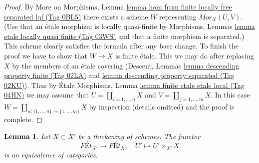 \documentclass{amsart}
\theoremstyle{plain}
\newtheorem{lemma}[subsection]{Lemma}
\theoremstyle{definition}
\theoremstyle{remark}
\numberwithin{equation}{subsection}
\begin{document}
\begin{proof}
By More on Morphisms, Lemma
\href{https://stacks.math.columbia.edu/tag/0BL5}{lemma hom from finite locally free separated lqf (Tag 0BL5)}
there exists a scheme $W$ representing $\mathit{Mor}_X(U, V)$.
(Use that an \'etale morphism is locally quasi-finite by
Morphisms, Lemmas \href{https://stacks.math.columbia.edu/tag/03WS}{lemma etale locally quasi finite (Tag 03WS)}
and that a finite morphism is separated.)
This scheme clearly satisfies the formula after any base change.
To finish the proof we have to show that $W \to X$ is finite \'etale.
This we may do after replacing $X$ by the members of an \'etale
covering (Descent, Lemmas \href{https://stacks.math.columbia.edu/tag/02LA}{lemma descending property finite (Tag 02LA)}
and \href{https://stacks.math.columbia.edu/tag/02KU}{lemma descending property separated (Tag 02KU)}).
Thus by \'Etale Morphisms, Lemma \href{https://stacks.math.columbia.edu/tag/04HN}{lemma finite etale etale local (Tag 04HN)}
we may assume that $U = \coprod_{i = 1, \ldots, n} X$
and $V = \coprod_{j = 1, \ldots, m} X$.
In this case
$W = \coprod_{\alpha : \{1, \ldots, n\} \to \{1, \ldots, m\}} X$
by inspection (details omitted) and the proof is complete.
\end{proof}


\begin{lemma}
\label{lemma-thickening}
Let $X \subset X'$ be a thickening of schemes. The functor
$$
\textit{F\'Et}_{X'} \longrightarrow \textit{F\'Et}_X,\quad
U' \longmapsto U' \times_{X'} X
$$
is an equivalence of categories.
\end{lemma}
\end{document}
